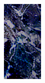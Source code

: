 \begin{figure}[]
\begin{subfigure}{0.6\textwidth}
\begin{subfigure}{0.48\textwidth}
\begin{subfigure}{0.32\textwidth}
                \includegraphics[width=\textwidth]{images/04-experiment02/human/marble/improved_proj_crop_red.jpeg}
                \caption*{}
            \end{subfigure}

\end{subfigure}
\end{subfigure}
\end{figure}
